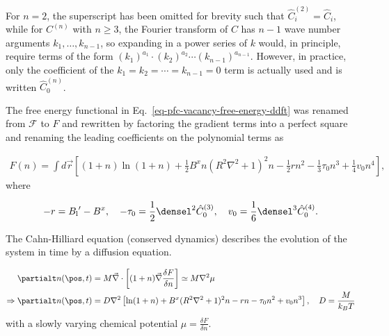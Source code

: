 %
%
For $n=2$, the superscript has been omitted for brevity such that $\hat{C}^{(2)}_i = \hat{C}_i$, while for $C^{(n)}$ with $n \ge 3$, the Fourier transform of $C$ has $n-1$ wave number arguments $k_1, \dots, k_{n-1}$, so expanding in a power series of $k$ would, in principle, require terms of the form $(k_1)^{a_1} \cdot (k_2)^{a_2} \cdots (k_{n-1})^{a_{n-1}}$.  However, in practice, only the coefficient of the $k_1 = k_2 = \cdots = k_{n-1} = 0$ term is actually used and is written $\hat{C}^{(n)}_0$.

The free energy functional in Eq.~\ref{eq-pfc-vacancy-free-energy-ddft} was renamed from $\mathcal{F}$ to $F$ and rewritten by factoring the gradient terms into a perfect square and renaming the leading coefficients on the polynomial terms as

\begin{align}
F(n) = \int d\vec{r} \left[ (1+n)\ln(1+n) + \frac{1}{2}B^x n (R^2\nabla^2 + 1)^2 n - \frac{1}{2} rn^2 - \frac{1}{3}\tau_0 n^3 + \frac{1}{4}v_0 n^4 \right],
\end{align}
%
where

\begin{align}
-r = {B_\text{l}}' - B^x, \quad -\tau_0 = \frac{1}{2} {\densel}^2 {\hat{C}_0}^{(3)}, \quad v_0 = \frac{1}{6}{\densel}^3 {\hat{C}_0}^{(4)}.
\end{align}

The Cahn-Hilliard equation (conserved dynamics) describes the evolution of the system in time by a diffusion equation.

\begin{align}
\partialt n(\pos, t) &= M \vec{\nabla} \cdot \left[ (1 + n)\vec{\nabla} \frac{\delta F}{\delta n} \right] \simeq M \nabla^2 \mu \\
\Rightarrow \partialt n(\pos, t) &= D \nabla^2 \left[ \ln(1+n) + B^x (R^2 \nabla^2 + 1)^2 n - r n - \tau_0 n^2 + v_0 n^3 \right], \quad D = \frac{M}{k_B T}
\end{align}
%
with a slowly varying chemical potential $\mu = \frac{\delta F}{\delta n}$.

